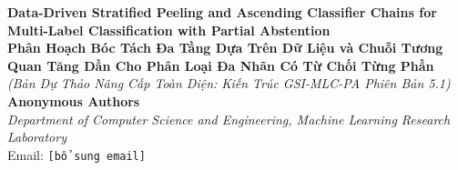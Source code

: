 \documentclass[11pt,a4paper]{article}
\begin{document}
\begin{center}
{\LARGE \textbf{Data-Driven Stratified Peeling and Ascending Classifier Chains for Multi-Label Classification with Partial Abstention}}\\[0.3cm]
{\Large \textbf{Phân Hoạch Bóc Tách Đa Tầng Dựa Trên Dữ Liệu và Chuỗi Tương Quan Tăng Dần Cho Phân Loại Đa Nhãn Có Từ Chối Từng Phần}}\\[0.2cm]
{\normalsize \textit{(Bản Dự Thảo Nâng Cấp Toàn Diện: Kiến Trúc GSI-MLC-PA Phiên Bản 5.1)}}\\[0.5cm]

{\large \textbf{Anonymous Authors}}\\[0.2cm]
{\small \textit{Department of Computer Science and Engineering, Machine Learning Research Laboratory}}\\[0.1cm]
{\small Email: \texttt{[bổ sung email]}}
\end{center}
\vspace{0.4cm}
\end{document}
